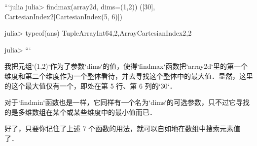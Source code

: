 ```julia
julia> findmax(array2d, dims=(1,2))
([30], CartesianIndex{2}[CartesianIndex(5, 6)])

julia> typeof(ans)
Tuple{Array{Int64,2},Array{CartesianIndex{2},2}}

julia> 
```

我把元组`(1,2)`作为了参数`dims`的值，使得`findmax`函数把`array2d`里的第一个维度和第二个维度作为一个整体看待，并去寻找这个整体中的最大值．显然，这里的这个最大值仅有一个，即处在第 5 行、第 6 列的`30`．

对于`findmin`函数也是一样，它同样有一个名为`dims`的可选参数，只不过它寻找的是多维数组在某个或某些维度中的最小值而已．

好了，只要你记住了上述 7 个函数的用法，就可以自如地在数组中搜索元素值了．